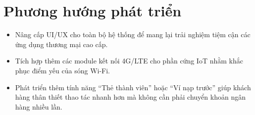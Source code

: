 \documentclass[../main.tex]{subfiles}
\begin{document}
\section*{Phương hướng phát triển}
\begin{itemize}
    \item Nâng cấp UI/UX cho toàn bộ hệ thống để mang lại trải nghiệm tiệm cận các ứng dụng thương mại cao cấp.
    \item Tích hợp thêm các module kết nối 4G/LTE cho phần cứng IoT nhằm khắc phục điểm yếu của sóng Wi-Fi.
    \item Phát triển thêm tính năng ``Thẻ thành viên'' hoặc ``Ví nạp trước'' giúp khách hàng thân thiết thao tác nhanh hơn mà không cần phải chuyển khoản ngân hàng nhiều lần.
\end{itemize}
\end{document}
